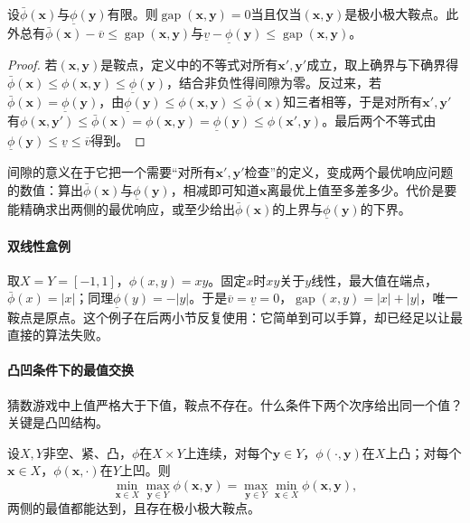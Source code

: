 \begin{lemma}[间隙作为证书]
\label{lem:opt-mmb-gap-certificate}
设$\bar\phi(\bm x)$与$\underline\phi(\bm y)$有限。则$\operatorname{gap}(\bm x,\bm y)=0$当且仅当$(\bm x,\bm y)$是极小极大鞍点。此外总有$\bar\phi(\bm x)-\overline v\leq\operatorname{gap}(\bm x,\bm y)$与$\underline v-\underline\phi(\bm y)\leq\operatorname{gap}(\bm x,\bm y)$。
\end{lemma}

\begin{proof}
若$(\bm x,\bm y)$是鞍点，定义中的不等式对所有$\bm x',\bm y'$成立，取上确界与下确界得$\bar\phi(\bm x)\leq\phi(\bm x,\bm y)\leq\underline\phi(\bm y)$，结合非负性得间隙为零。反过来，若$\bar\phi(\bm x)=\underline\phi(\bm y)$，由$\underline\phi(\bm y)\leq\phi(\bm x,\bm y)\leq\bar\phi(\bm x)$知三者相等，于是对所有$\bm x',\bm y'$有$\phi(\bm x,\bm y')\leq\bar\phi(\bm x)=\phi(\bm x,\bm y)=\underline\phi(\bm y)\leq\phi(\bm x',\bm y)$。最后两个不等式由$\underline\phi(\bm y)\leq\underline v\leq\overline v$得到。
\end{proof}

间隙的意义在于它把一个需要“对所有$\bm x',\bm y'$检查”的定义，变成两个最优响应问题的数值：算出$\bar\phi(\bm x)$与$\underline\phi(\bm y)$，相减即可知道$\bm x$离最优上值至多差多少。代价是要能精确求出两侧的最优响应，或至少给出$\bar\phi(\bm x)$的上界与$\underline\phi(\bm y)$的下界。

\paragraph{双线性盒例}
取$X=Y=[-1,1]$，$\phi(x,y)=xy$。固定$x$时$xy$关于$y$线性，最大值在端点，$\bar\phi(x)=|x|$；同理$\underline\phi(y)=-|y|$。于是$\overline v=\underline v=0$，$\operatorname{gap}(x,y)=|x|+|y|$，唯一鞍点是原点。这个例子在后两小节反复使用：它简单到可以手算，却已经足以让最直接的算法失败。

\paragraph{凸凹条件下的最值交换}
猜数游戏中上值严格大于下值，鞍点不存在。什么条件下两个次序给出同一个值？关键是凸凹结构。

\begin{theorem}[紧凸凹条件下的极小极大定理]
\label{thm:opt-mmb-minimax}
设$X,Y$非空、紧、凸，$\phi$在$X\times Y$上连续，对每个$\bm y\in Y$，$\phi(\cdot,\bm y)$在$X$上凸；对每个$\bm x\in X$，$\phi(\bm x,\cdot)$在$Y$上凹。则
\[
\min_{\bm x\in X}\max_{\bm y\in Y}\phi(\bm x,\bm y)=\max_{\bm y\in Y}\min_{\bm x\in X}\phi(\bm x,\bm y),
\]
两侧的最值都能达到，且存在极小极大鞍点。
\end{theorem}

